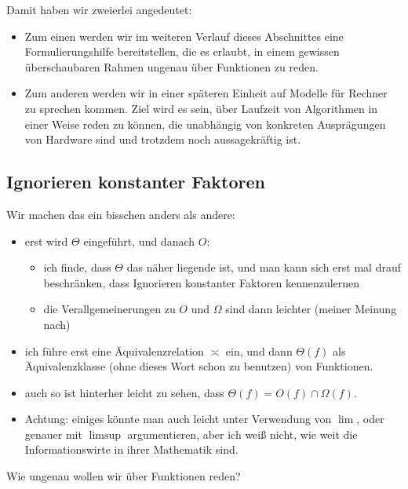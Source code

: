Damit haben wir zweierlei angedeutet: 
%
\begin{itemize}
\item Zum einen werden wir im weiteren Verlauf dieses Abschnittes eine
  Formulierungshilfe bereitstellen, die es erlaubt, in einem gewissen
  überschaubaren Rahmen ungenau über Funktionen zu reden.
\item Zum anderen werden wir in einer späteren Einheit auf Modelle für
  Rechner zu sprechen kommen. Ziel wird es sein, \zB über Laufzeit von
  Algorithmen in einer Weise reden zu können, die unabhängig von
  konkreten Ausprägungen von Hardware sind und trotzdem noch
  aussagekräftig ist.
\end{itemize}
%

\Tut\subsection{Ignorieren konstanter Faktoren}
\label{subsec:gross-theta}

\begin{tutorium}
  Wir machen das ein bisschen anders als andere:
  \begin{itemize}
  \item erst wird $\Theta$ eingeführt, und danach $O$: 
    \begin{itemize}
    \item ich finde, dass $\Theta$ das näher liegende ist, und man
      kann sich erst mal drauf beschränken, dass Ignorieren konstanter
      Faktoren kennenzulernen
    \item die Verallgemeinerungen zu $O$ und $\Omega$ sind dann
      leichter (meiner Meinung nach)
    \end{itemize}
  \item ich führe erst eine Äquivalenzrelation $\asymp$ ein, und dann
    $\Theta(f)$ als Äquivalenzklasse (ohne dieses Wort schon zu
    benutzen) von Funktionen.
  \item auch so ist hinterher leicht zu sehen, dass $\Theta(f)=O(f)\cap
    \Omega(f)$.
  \item Achtung: einiges könnte man auch leicht unter Verwendung von
    $\lim$, oder genauer mit $\limsup$ argumentieren, aber ich weiß
    nicht, wie weit die Informationswirte in ihrer Mathematik sind.
  \end{itemize}
\end{tutorium}
Wie ungenau wollen wir über Funktionen reden?

